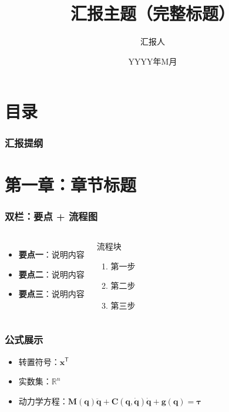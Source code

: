 \documentclass[aspectratio=169]{beamer}
\title[汇报主题（短标题）]{汇报主题（完整标题）}
\author{汇报人}
\institute[南京理工大学]
{
	南京理工大学 \\
	\medskip
	\textit{邮箱@njust.edu.cn}
}
\date{YYYY年M月}
\newcommand{\T}{^{\mathsf{T}}}
\newcommand{\R}{\mathbb{R}}
\newcommand{\mat}[1]{\bm{#1}}
\newcommand{\tbf}[1]{\textbf{#1}}
\begin{document}
\begin{frame}
	\titlepage
\end{frame}

\section*{目录}
\begin{frame}
	\frametitle{汇报提纲}
	\tableofcontents
\end{frame}

\section{第一章：章节标题}

\begin{frame}
	\frametitle{双栏：要点 + 流程图}
	\begin{columns}[T]
		\begin{itemize}
			\item \tbf{要点一}：说明内容
			\item \tbf{要点二}：说明内容
			\item \tbf{要点三}：说明内容
		\end{itemize}

		\vspace{0.3cm}
		\begin{block}{流程块}
			\begin{enumerate}
				\item 第一步
				\item 第二步
				\item 第三步
			\end{enumerate}
		\end{block}
	\end{columns}
\end{frame}

\begin{frame}
	\frametitle{公式展示}
	\begin{itemize}
		\item 转置符号：$\mat{x}\T$
		\item 实数集：$\R^n$
		\item 动力学方程：$\mat{M}(\mat{q})\ddot{\mat{q}} + \mat{C}(\mat{q},\dot{\mat{q}})\dot{\mat{q}} + \mat{g}(\mat{q}) = \bm{\tau}$
	\end{itemize}
\end{frame}
\end{document}
